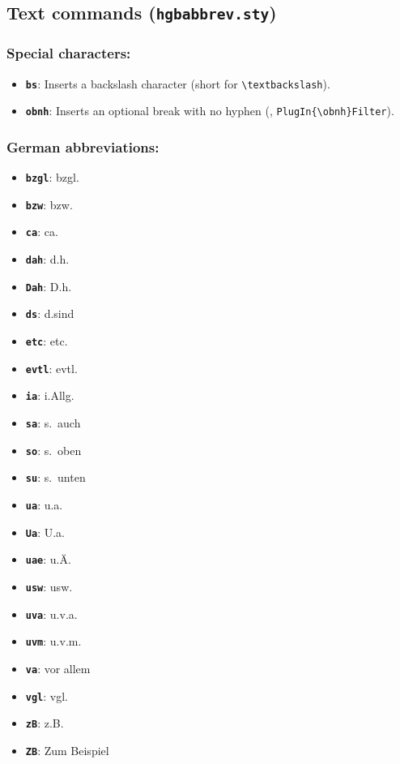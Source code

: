 \documentclass[english]{hgbarticle}
\begin{document}
\subsection{Text commands (\texttt{hgbabbrev.sty})}

\subsubsection*{Special characters:}

\begin{itemize}
    \item \textbf{\texttt{{\bs}bs}}: Inserts a backslash character (short for
    \verb!\textbackslash!).
    \item \textbf{\texttt{{\bs}obnh}}: Inserts an optional break with no
    hyphen (\eg, \verb!PlugIn{\obnh}Filter!).
\end{itemize}


\subsubsection*{German abbreviations:}

\begin{itemize}
    \item \textbf{\texttt{{\bs}bzgl}}: bzgl.
    \item \textbf{\texttt{{\bs}bzw}}: bzw.
    \item \textbf{\texttt{{\bs}ca}}: ca.
    \item \textbf{\texttt{{\bs}dah}}: d.\thinspace{}h.
    \item \textbf{\texttt{{\bs}Dah}}: D.\thinspace{}h.
    \item \textbf{\texttt{{\bs}ds}}: d.\thinspace{}sind
    \item \textbf{\texttt{{\bs}etc}}: etc.
    \item \textbf{\texttt{{\bs}evtl}}: evtl.
    \item \textbf{\texttt{{\bs}ia}}: i.\thinspace{}Allg.
    \item \textbf{\texttt{{\bs}sa}}: s.\ auch
    \item \textbf{\texttt{{\bs}so}}: s.\ oben
    \item \textbf{\texttt{{\bs}su}}: s.\ unten
    \item \textbf{\texttt{{\bs}ua}}: u.\thinspace{}a.
    \item \textbf{\texttt{{\bs}Ua}}: U.\thinspace{}a.
    \item \textbf{\texttt{{\bs}uae}}: u.\thinspace{}\"A.
    \item \textbf{\texttt{{\bs}usw}}: usw.
    \item \textbf{\texttt{{\bs}uva}}: u.\thinspace{}v.\thinspace{}a.
    \item \textbf{\texttt{{\bs}uvm}}: u.\thinspace{}v.\thinspace{}m.
    \item \textbf{\texttt{{\bs}va}}: vor allem
    \item \textbf{\texttt{{\bs}vgl}}: vgl.
    \item \textbf{\texttt{{\bs}zB}}: z.\thinspace{}B.
    \item \textbf{\texttt{{\bs}ZB}}: Zum Beispiel
\end{itemize}
\end{document}
